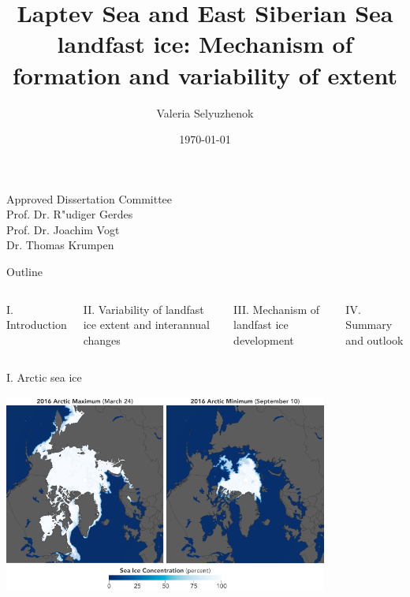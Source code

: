 \documentclass[8pt]{beamer}
\title{Laptev Sea and East Siberian Sea landfast ice: Mechanism of formation and variability of extent}
\date{\today}
\author{Valeria Selyuzhenok}
\institute{Jacobs University Bremen}
\begin{document}
\maketitle
{}
\begin{flushright}
		\textsf {Approved Dissertation Committee}\\[0.4cm]	
		\textsf{Prof. Dr. R"udiger Gerdes}\\ 
		\textsf{Prof. Dr. Joachim Vogt}\\ 	
		\textsf{Dr. Thomas Krumpen}\\ 
\end{flushright}
	
\setwatermark{\fontsize{125pt}{125pt}\selectfont{}}
\begin{frame}{Outline}
	\begin{columns}
		\begin{block}{I. Introduction}
		\end{block}
		\begin{block}{II. Variability of landfast ice extent and interannual changes}
		\end{block}
		\begin{block}{III. Mechanism of landfast ice development}
		\end{block}
		\begin{block}{IV. Summary and outlook} 
		\end{block}
	\end{columns}
\end{frame}

\setwatermark{\fontsize{125pt}{125pt}\selectfont{}}
\begin{frame}[fragile]{I. Arctic sea ice}
	\begin{center}
	\includegraphics[width=0.8\textwidth]{./img/arctic_min_max_map.png}
	\end{center}
\end{frame}
	
\end{document}
